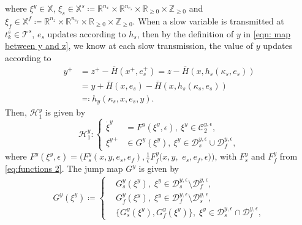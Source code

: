 where $\xi^y \in \mathbb{X}$, $\xi_s \in \mathbb{X}^{s} \coloneqq \mathbb{R}^{n_x} \times \mathbb{R}^{n_{e_s}} \times \mathbb{R}_{\geq 0} \times \mathbb{Z}_{\geq 0}$ and $\xi_f \in  \mathbb{X}^{f} \coloneqq \mathbb{R}^{n_z} \times \mathbb{R}^{n_{e_f}} \times \mathbb{R}_{\geq 0} \times \mathbb{Z}_{\geq 0}$. 
%
When a slow variable is transmitted at $t_k^s \in \mathcal{T}^s$, $e_s$ updates according to $h_s$, then by the definition of $y$ in \eqref{eqn: map between y and z}, we know at each slow transmission, the value of $y$ updates according to
\begin{equation}
    \begin{aligned}
        y^+ &= z^+ - \overline{H}(x^+, e_{s}^+)= z - \overline{H}(x, h_s(\kappa_s, e_s)) \\
        &= y + \overline{H}(x, e_s) - \overline{H}(x, h_s(\kappa_s, e_s)) \\
        & \eqqcolon h_y(\kappa_s,x,e_s,y). 
    \end{aligned}
    \label{eqn: Jump of y at slow transmission}
\end{equation}
%
Then, $\mathcal{H}_1^y$ is given by
\begin{equation}
    \mathcal{H}_1^y:\left\{
\begin{aligned}
    \dot{\xi}^y &= F^y(\xi^y, \epsilon),\ \xi^y \in \mathcal{C}_2^{y,\epsilon}, \\
    {\xi^y}^+ &\in G^y(\xi^y), \ \xi^y\in \mathcal{D}_s^{y,\epsilon} \cup \mathcal{D}_f^{y,\epsilon},
\end{aligned}
    \right.
    \label{eqn: H_2^y}
\end{equation}
where $F^y(\xi^y, \epsilon) = \big(F_s^y(x,y,e_s,e_f), \tfrac{1}{\epsilon}F_f^y(x,y, $     $e_s,e_f,\epsilon)\big)$, with $F_s^y$ and $F_f^y$ from \eqref{eq:functions 2}. 
The jump map $G^y$ is given by
\begin{equation}
\begin{aligned}
    G^y(\xi^y) \coloneqq \left\{ 
    \begin{aligned}
    &G_s^y(\xi^y),  \;\xi^y\in\mathcal{D}_s^{y,\epsilon} \setminus \mathcal{D}_f^{y,\epsilon} , \\
    &G_f^y(\xi^y),  \;  \xi^y \in\mathcal{D}_f^{y,\epsilon} \setminus \mathcal{D}_s^{y,\epsilon} ,\\
    &\{G_s^y(\xi^y),G_f^y(\xi^y)\}, \; \xi^y\in \mathcal{D}_s^{y,\epsilon} \cap \mathcal{D}_f^{y,\epsilon},
    \end{aligned}
    \right. 
\end{aligned}
\label{eqn: G^y}
\end{equation}
